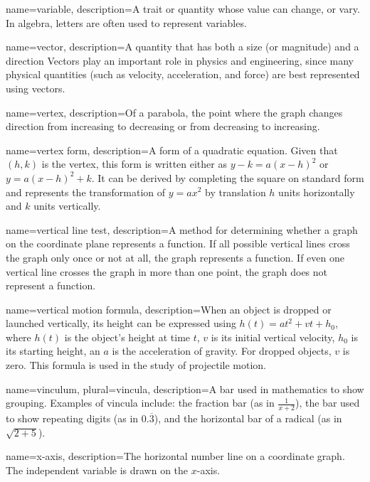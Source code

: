  {
	name=variable,
	description={A trait or quantity whose value can change, or vary. In algebra, letters are often used to represent variables.}
}

 {
	name=vector,
	description={A quantity that has both a size (or magnitude) and a direction Vectors play an important role in physics and engineering, since many physical quantities (such as velocity, acceleration, and force) are best represented using vectors.}
}

 {
	name=vertex,
	description={Of a parabola, the point where the graph changes direction from increasing to decreasing or from decreasing to increasing.}
}

 {
	name=vertex form,
	description={A form of a quadratic equation. Given that $(h,k)$ is the vertex, this form is written either as $y-k = a(x-h)^2$ or $y=a(x-h)^2+k$. It can be derived by completing the square on standard form and represents the transformation of $y = ax^2$ by translation $h$ units horizontally and $k$ units vertically.}
}

 {
	name=vertical line test,
	description={A method for determining whether a graph on the coordinate plane represents a function. If all possible vertical lines cross the graph only once or not at all, the graph represents a function. If even one vertical line crosses the graph in more than one point, the graph does not represent a function.}
}

 {
	name=vertical motion formula,
	description={When an object is dropped or launched vertically, its height can be expressed using $h(t) = at^2 + vt + h_0$, where $h(t)$ is the object's height at time $t$, $v$ is its initial vertical velocity, $h_0$ is its starting height, an $a$ is the acceleration of gravity. For dropped objects, $v$ is zero. This formula is used in the study of projectile motion.}
}

 {
	name=vinculum,
	plural=vincula,
	description={A bar used in mathematics to show grouping. Examples of vincula include: the fraction bar (as in $\frac{1}{x+2}$), the bar used to show repeating digits (as in $0.\overline{3}$), and the horizontal bar of a radical (as in $\sqrt{2+5}$).}
}

 {
	name=x-axis,
	description={The horizontal number line on a coordinate graph. The independent variable is drawn on the $x$-axis.}
}

